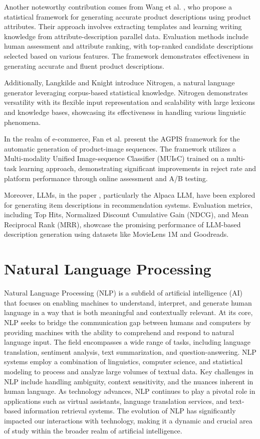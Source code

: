 Another noteworthy contribution comes from Wang et al. \cite{wang-etal-2017-statistical}, who propose a statistical framework for generating accurate product descriptions using product attributes. Their approach involves extracting templates and learning writing knowledge from attribute-description parallel data. Evaluation methods include human assessment and attribute ranking, with top-ranked candidate descriptions selected based on various features. The framework demonstrates effectiveness in generating accurate and fluent product descriptions.

Additionally, Langkilde and Knight \cite{langkilde-knight-1998-generation-exploits} introduce Nitrogen, a natural language generator leveraging corpus-based statistical knowledge. Nitrogen demonstrates versatility with its flexible input representation and scalability with large lexicons and knowledge bases, showcasing its effectiveness in handling various linguistic phenomena.

In the realm of e-commerce, Fan et al. \cite{Fan_2022} present the AGPIS framework for the automatic generation of product-image sequences. The framework utilizes a Multi-modality Unified Image-sequence Classifier (MUIsC) trained on a multi-task learning approach, demonstrating significant improvements in reject rate and platform performance through online assessment and A/B testing.

Moreover, LLMs, in the paper \cite{10.1145/3604915.3610647}, particularly the Alpaca LLM, have been explored for generating item descriptions in recommendation systems. Evaluation metrics, including Top Hits, Normalized Discount Cumulative Gain (NDCG), and Mean Reciprocal Rank (MRR), showcase the promising performance of LLM-based description generation using datasets like MovieLens 1M and Goodreads.

\section{Natural Language Processing}
Natural Language Processing (NLP) is a subfield of artificial intelligence (AI) that focuses on enabling machines to understand, interpret, and generate human language in a way that is both meaningful and contextually relevant. At its core, NLP seeks to bridge the communication gap between humans and computers by providing machines with the ability to comprehend and respond to natural language input. The field encompasses a wide range of tasks, including language translation, sentiment analysis, text summarization, and question-answering. NLP systems employ a combination of linguistics, computer science, and statistical modeling to process and analyze large volumes of textual data. Key challenges in NLP include handling ambiguity, context sensitivity, and the nuances inherent in human language. As technology advances, NLP continues to play a pivotal role in applications such as virtual assistants, language translation services, and text-based information retrieval systems. The evolution of NLP has significantly impacted our interactions with technology, making it a dynamic and crucial area of study within the broader realm of artificial intelligence. \cite{indurkhya2010handbook} \cite{nlp_ai_2023}

